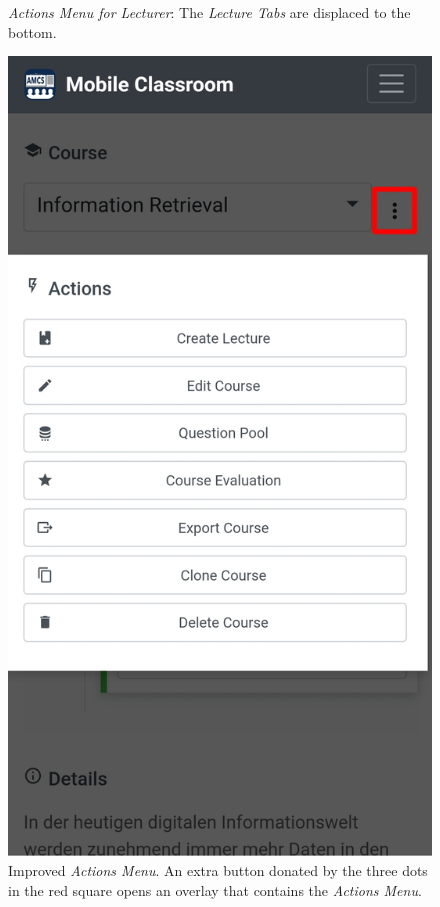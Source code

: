\begin{figure}
\begin{minipage}[t]{.5\textwidth}
		\captionsetup{width=.8\linewidth}
		\caption{\emph{Actions Menu for Lecturer}: The \emph{Lecture Tabs} are displaced to the bottom. }
		\label{fig:main_view_lecture_box_updated}
	\end{minipage}%
	\begin{minipage}[t]{.5\textwidth}
		\centering
		\includegraphics[width=0.95\linewidth]{screenshots/redesign/main_view_iteration_4_actions.jpg}
		\captionsetup{width=.8\linewidth}
		\caption{Improved \emph{Actions Menu}. An extra button donated by the three dots in the red square opens an overlay that contains the \emph{Actions Menu}.}
		\label{fig:main_view_lecture_tab_labels}
	\end{minipage}
\end{figure}



